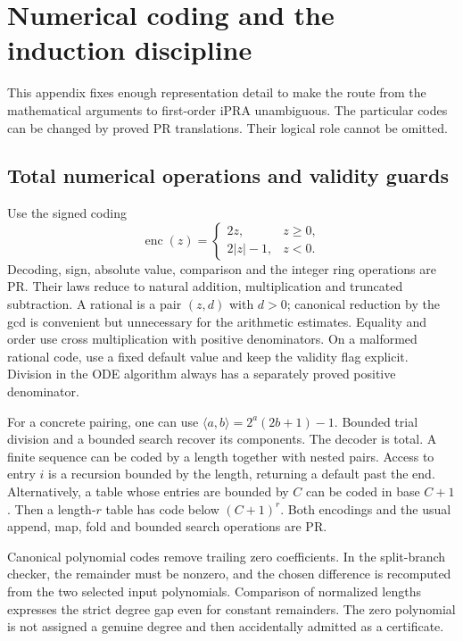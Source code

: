 \section{Numerical coding and the induction discipline}\label{sec:coding}

This appendix fixes enough representation detail to make the route from
the mathematical arguments to first-order iPRA unambiguous. The particular
codes can be changed by proved PR translations. Their logical role cannot
be omitted.

\subsection{Total numerical operations and validity guards}

Use the signed coding
\[
 \operatorname{enc}(z)=
 \begin{cases}2z,&z\ge0,\\2|z|-1,&z<0.\end{cases}
\]
Decoding, sign, absolute value, comparison and the integer ring operations
are PR. Their laws reduce to natural addition, multiplication
and truncated subtraction. A rational is a pair $(z,d)$ with $d>0$;
canonical reduction by the gcd is convenient but unnecessary for the
arithmetic estimates. Equality and order use cross multiplication with
positive denominators. On a malformed rational code, use a fixed default
value and keep the validity flag explicit. Division in the ODE algorithm
always has a separately proved positive denominator.

For a concrete pairing, one can use
$\langle a,b\rangle=2^a(2b+1)-1$. Bounded trial division and a bounded
search recover its components. The decoder is total. A finite sequence
can be coded by a length together with nested pairs. Access to entry $i$
is a recursion bounded by the length, returning a default past the end.
Alternatively, a table whose entries are bounded by $C$ can be coded in
base $C+1$. Then a length-$r$ table has code below $(C+1)^r$.
Both encodings and the usual append, map, fold and bounded search
operations are PR.

Canonical polynomial codes remove trailing zero coefficients. In the
split-branch checker, the remainder must be nonzero, and the chosen
difference is recomputed from the two selected input polynomials.
Comparison of normalized lengths expresses the strict degree gap even
for constant remainders. The zero polynomial is not assigned a genuine
degree and then accidentally admitted as a certificate.

